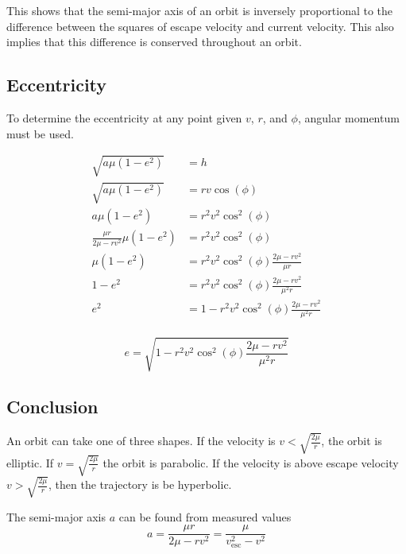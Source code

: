 \documentclass{article}
\begin{document}
This shows that the semi-major axis of an orbit is inversely proportional to the difference between the squares of escape velocity and current velocity. This also implies that this difference is conserved throughout an orbit.

\bigskip\bigskip
\subsection{Eccentricity}\label{sec:Eccentricity in Terms of V,R}

To determine the eccentricity at any point given $v$, $r$, and $\phi$, angular momentum must be used.

\begin{align*}
    \sqrt{a\mu(1-e^2)}                & =h                                            \\
    \sqrt{a\mu(1-e^2)}                & =rv\cos(\phi)                                 \\
    a\mu(1-e^2)                       & =r^2v^2\cos^2(\phi)                           \\
    \frac{\mu r}{2\mu-rv^2}\mu(1-e^2) & =r^2v^2\cos^2(\phi)                           \\
    \mu(1-e^2)                        & =r^2v^2\cos^2(\phi)\frac{2\mu-rv^2}{\mu r}    \\
    1-e^2                             & =r^2v^2\cos^2(\phi)\frac{2\mu-rv^2}{\mu^2r}   \\
    e^2                               & =1-r^2v^2\cos^2(\phi)\frac{2\mu-rv^2}{\mu^2r} \\
\end{align*}

\begin{equation}
    e=\sqrt{1-r^2v^2\cos^2(\phi)\frac{2\mu-rv^2}{\mu^2r}}
\end{equation}

\bigskip\bigskip
\subsection{Conclusion}

\bigskip
An orbit can take one of three shapes. If the velocity is $v<\sqrt{\frac{2\mu}{r}}$, the orbit is elliptic. If $v=\sqrt{\frac{2\mu}{r}}$ the orbit is parabolic. If the velocity is above escape velocity $v>\sqrt{\frac{2\mu}{r}}$, then the trajectory is be hyperbolic.

\bigskip
The semi-major axis $a$ can be found from measured values
$$a=\frac{\mu r}{2\mu-rv^2}=\frac{\mu}{v_\text{esc}^2-v^2}$$
\end{document}
